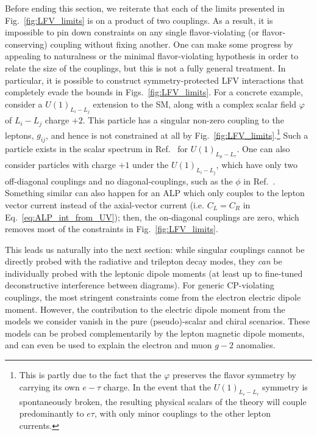 {Before ending this section, we reiterate that each of the limits presented in Fig.~\ref{fig:LFV_limits} is on a product of two couplings.  As a result, it is impossible to pin down constraints on any single flavor-violating (or flavor-conserving) coupling without fixing another. One can make some progress by appealing to naturalness or the minimal flavor-violating hypothesis \cite{Isidori:2012ts} in order to relate the size of the couplings, but this is not a fully general treatment. In particular, it is possible to construct symmetry-protected LFV interactions that completely evade the bounds in Figs.~\ref{fig:LFV_limits}. For a concrete  example, consider a $U(1)_{L_i - L_j}$ extension to the SM, along with a complex scalar field $\varphi$ of $L_i - L_j$ charge $+2$.  This particle has a singular non-zero coupling to the leptons, $g_{ij}$, and hence is not constrained at all by Fig.~\ref{fig:LFV_limits}.\footnote{This is partly due to the fact that the $\varphi$ preserves the flavor symmetry by carrying its own $e-\tau$ charge. In the event that the $U(1)_{L_e - L_\tau}$ symmetry is spontaneously broken, the resulting physical scalars of the theory will couple predominantly to $e\tau$, with only minor couplings to the other lepton currents.} Such a particle exists in the scalar spectrum in Ref.~\cite{Crivellin:2015mga} for $U(1)_{L_\mu - L_\tau}$. One can also consider particles with charge $+1$ under the $U(1)_{L_i - L_j}$, which have only two off-diagonal couplings and no diagonal-couplings, such as the $\phi$ in Ref.~\cite{Heeck:2011wj}. Something similar can also happen for an ALP which only couples to the lepton vector current instead of the axial-vector current (i.e. $C_L = C_R$ in Eq.~\ref{eq:ALP_int_from_UV}); then, the on-diagonal couplings are zero, which removes most of the constraints in Fig.~\ref{fig:LFV_limits}.

This leads us naturally into the next section: while singular couplings cannot be directly probed with the radiative and trilepton decay modes, they {\it can} be individually probed with the leptonic dipole moments (at least up to fine-tuned deconstructive interference between diagrams). For generic CP-violating couplings, the most stringent constraints come from the electron electric dipole moment. However, the contribution to the electric dipole moment from the models we consider vanish in the pure (pseudo)-scalar and chiral scenarios. These models can be probed complementarily by the lepton magnetic dipole moments, and can even be used to explain the electron and muon $g-2$ anomalies. 

}
